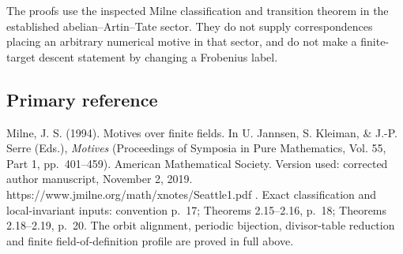 The proofs use the inspected Milne classification and transition theorem
in the established abelian--Artin--Tate sector. They do not supply
correspondences placing an arbitrary numerical motive in that sector,
and do not make a finite-target descent statement by changing a
Frobenius label.

\subsection{Primary reference}\label{primary-reference}

Milne, J. S. (1994). Motives over finite fields. In U. Jannsen, S.
Kleiman, \& J.-P. Serre (Eds.), \emph{Motives} (Proceedings of Symposia
in Pure Mathematics, Vol. 55, Part 1, pp.~401--459). American
Mathematical Society. Version used: corrected author manuscript,
November 2, 2019. https://www.jmilne.org/math/xnotes/Seattle1.pdf .
Exact classification and local-invariant inputs: convention p.~17;
Theorems 2.15--2.16, p.~18; Theorems 2.18--2.19, p.~20. The orbit
alignment, periodic bijection, divisor-table reduction and finite
field-of-definition profile are proved in full above.
